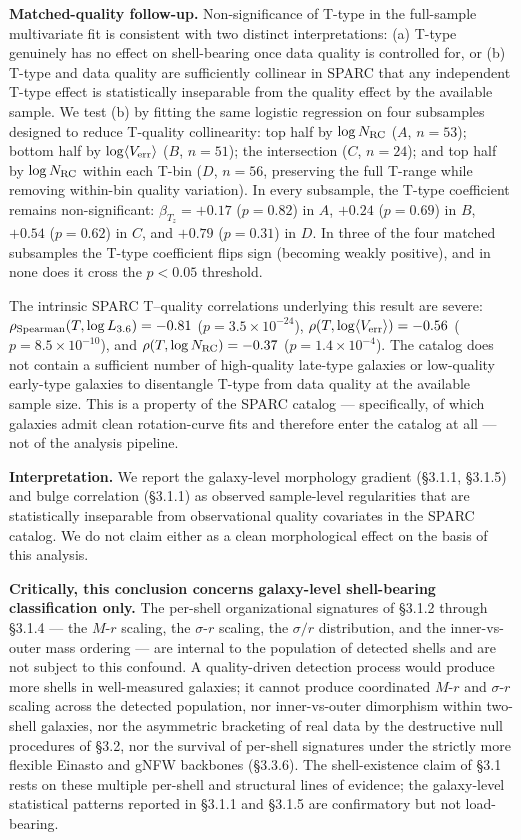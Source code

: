 \documentclass[linenumbers,trackchanges]{aastex701}
\begin{document}
\textbf{Matched-quality follow-up.} Non-significance of T-type in the full-sample multivariate fit is consistent with two distinct interpretations: (a) T-type genuinely has no effect on shell-bearing once data quality is controlled for, or (b) T-type and data quality are sufficiently collinear in SPARC that any independent T-type effect is statistically inseparable from the quality effect by the available sample. We test (b) by fitting the same logistic regression on four subsamples designed to reduce T-quality collinearity: top half by $\log N_{\rm RC}$ ($A$, $n = 53$); bottom half by $\log \langle V_{\rm err} \rangle$ ($B$, $n = 51$); the intersection ($C$, $n = 24$); and top half by $\log N_{\rm RC}$ within each T-bin ($D$, $n = 56$, preserving the full T-range while removing within-bin quality variation). In every subsample, the T-type coefficient remains non-significant: $\beta_{T_z} = +0.17$ ($p = 0.82$) in $A$, $+0.24$ ($p = 0.69$) in $B$, $+0.54$ ($p = 0.62$) in $C$, and $+0.79$ ($p = 0.31$) in $D$. In three of the four matched subsamples the T-type coefficient flips sign (becoming weakly positive), and in none does it cross the $p < 0.05$ threshold.

The intrinsic SPARC T--quality correlations underlying this result are severe: $\rho_{\rm Spearman}(T, \log L_{3.6}) = -0.81$ ($p = 3.5 \times 10^{-24}$), $\rho(T, \log \langle V_{\rm err} \rangle) = -0.56$ ($p = 8.5 \times 10^{-10}$), and $\rho(T, \log N_{\rm RC}) = -0.37$ ($p = 1.4 \times 10^{-4}$). The catalog does not contain a sufficient number of high-quality late-type galaxies or low-quality early-type galaxies to disentangle T-type from data quality at the available sample size. This is a property of the SPARC catalog --- specifically, of which galaxies admit clean rotation-curve fits and therefore enter the catalog at all --- not of the analysis pipeline.

\textbf{Interpretation.} We report the galaxy-level morphology gradient (\S3.1.1, \S3.1.5) and bulge correlation (\S3.1.1) as observed sample-level regularities that are statistically inseparable from observational quality covariates in the SPARC catalog. We do not claim either as a clean morphological effect on the basis of this analysis.

\textbf{Critically, this conclusion concerns galaxy-level shell-bearing classification only.} The per-shell organizational signatures of \S3.1.2 through \S3.1.4 --- the $M$-$r$ scaling, the $\sigma$-$r$ scaling, the $\sigma/r$ distribution, and the inner-vs-outer mass ordering --- are internal to the population of detected shells and are not subject to this confound. A quality-driven detection process would produce more shells in well-measured galaxies; it cannot produce coordinated $M$-$r$ and $\sigma$-$r$ scaling across the detected population, nor inner-vs-outer dimorphism within two-shell galaxies, nor the asymmetric bracketing of real data by the destructive null procedures of \S3.2, nor the survival of per-shell signatures under the strictly more flexible Einasto and gNFW backbones (\S3.3.6). The shell-existence claim of \S3.1 rests on these multiple per-shell and structural lines of evidence; the galaxy-level statistical patterns reported in \S3.1.1 and \S3.1.5 are confirmatory but not load-bearing.
\end{document}
